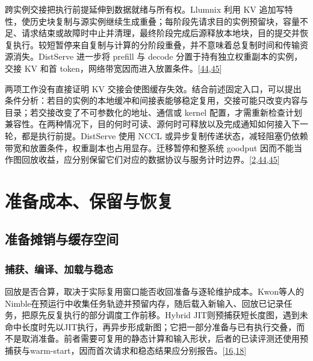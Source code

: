\documentclass[
  UTF8,
  zihao=5]{ctexart}
\begin{document}
跨实例交接把执行前提延伸到数据就绪与所有权。Llumnix 利用 KV
追加写特性，使历史块复制与源实例继续生成重叠；每阶段先请求目的实例预留块，容量不足、请求结束或故障时中止并清理，最终阶段完成后源释放本地块，目的提交并恢复执行。较短暂停来自复制与计算的分阶段重叠，并不意味着总复制时间和传输资源消失。DistServe
进一步将 prefill 与 decode 分置于持有独立权重副本的实例，交接 KV 和首
token，网络带宽因而进入放置条件。{[}\protect\hyperlink{ref-sun2024llumnix}{44},\protect\hyperlink{ref-zhong2024distserve}{45}{]}

两项工作没有直接证明 KV
交接会使图缓存失效。结合前述固定入口，可以提出条件分析：若目的实例的本地缓冲和间接表能够稳定复用，交接可能只改变内容与目录；若交接改变了不可参数化的地址、通信或
kernel
配置，才需重新检查计划兼容性。在两种情况下，目的何时可读、源何时可释放以及完成通知如何接入下一轮，都是执行前提。DistServe
使用 NCCL
或异步复制传递状态，减轻阻塞仍依赖带宽和放置条件，权重副本也占用显存。迁移暂停和整系统
goodput
因而不能当作图回放收益，应分别保留它们对应的数据协议与服务计时边界。{[}\protect\hyperlink{ref-ye2025flashinfer}{2},\protect\hyperlink{ref-sun2024llumnix}{44},\protect\hyperlink{ref-zhong2024distserve}{45}{]}

\hypertarget{ux51c6ux5907ux6210ux672cux4fddux7559ux4e0eux6062ux590d}{%
\section{准备成本、保留与恢复}\label{ux51c6ux5907ux6210ux672cux4fddux7559ux4e0eux6062ux590d}}

\hypertarget{ux51c6ux5907ux644aux9500ux4e0eux7f13ux5b58ux7a7aux95f4}{%
\subsection{准备摊销与缓存空间}\label{ux51c6ux5907ux644aux9500ux4e0eux7f13ux5b58ux7a7aux95f4}}

\hypertarget{ux6355ux83b7ux7f16ux8bd1ux52a0ux8f7dux4e0eux7a33ux6001}{%
\subsubsection{捕获、编译、加载与稳态}\label{ux6355ux83b7ux7f16ux8bd1ux52a0ux8f7dux4e0eux7a33ux6001}}

回放是否合算，取决于实际复用窗口能否收回准备与逐轮维护成本。Kwon等人的Nimble在预运行中收集任务轨迹并预留内存，随后载入新输入、回放已记录任务，把原先反复执行的部分调度工作前移。Hybrid
JIT则预捕获短长度图，遇到未命中长度时先以JIT执行，再异步形成新图；它把一部分准备与已有执行交叠，而不是取消准备。前者需要可复用的静态计算和输入形状，后者的已读评测还使用预捕获与warm-start，因而首次请求和稳态结果应分别报告。{[}\protect\hyperlink{ref-kwon2020nimble}{16},\protect\hyperlink{ref-yadav2026hybridpreprint}{18}{]}
\end{document}
